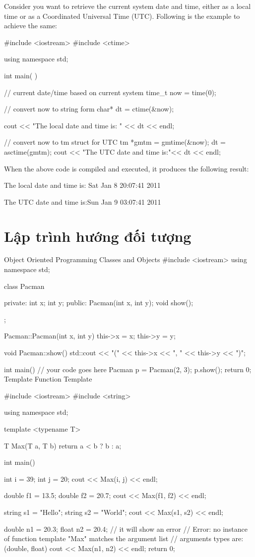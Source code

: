 Consider you want to retrieve the current system date and time, either as a local time or as a Coordinated Universal Time (UTC). Following is the example to achieve the same:

#include <iostream>
#include <ctime>

using namespace std;

int main( ) {
   // current date/time based on current system
   time_t now = time(0);

   // convert now to string form
   char* dt = ctime(&now);

   cout << "The local date and time is: " << dt << endl;

   // convert now to tm struct for UTC
   tm *gmtm = gmtime(&now);
   dt = asctime(gmtm);
   cout << "The UTC date and time is:"<< dt << endl;
}
When the above code is compiled and executed, it produces the following result:

The local date and time is: Sat Jan  8 20:07:41 2011

The UTC date and time is:Sun Jan  9 03:07:41 2011

\section{Lập trình hướng đối tượng}

Object Oriented Programming
Classes and Objects
#include <iostream>
using namespace std;

class Pacman {

    private:
      int x;
      int y;
    public:
    Pacman(int x, int y);
    void show();
};

Pacman::Pacman(int x, int y){
    this->x = x;
    this->y = y;
}

void Pacman::show(){
    std::cout << "(" << this->x << ", " << this->y << ")";
}

int main() {
    // your code goes here
    Pacman p = Pacman(2, 3);
    p.show();
    return 0;
}
Template
Function Template

#include <iostream>
#include <string>

using namespace std;

template <typename T>

T Max(T a, T b)
{
    return a < b ? b : a;
}

int main()
{

    int i = 39;
    int j = 20;
    cout << Max(i, j) << endl;

    double f1 = 13.5;
    double f2 = 20.7;
    cout << Max(f1, f2) << endl;

    string s1 = "Hello";
    string s2 = "World";
    cout << Max(s1, s2) << endl;

    double n1 = 20.3;
    float n2 = 20.4;
    // it will show an error
    // Error: no instance of function template "Max" matches the argument list
    //        arguments types are: (double, float)
    cout << Max(n1, n2) << endl;
    return 0;
}

